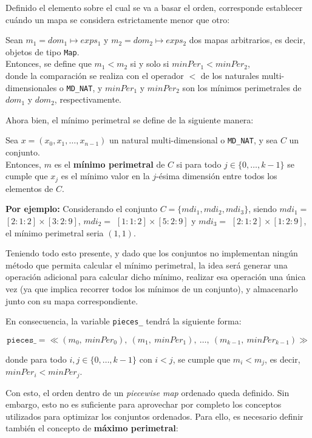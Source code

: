 Definido el elemento sobre el cual se va a basar el orden, corresponde establecer cuándo un mapa se considera estrictamente menor que otro:

\begin{center}
Sean $m_1 = dom_1 \longmapsto exps_1$ y $m_2 = dom_2 \longmapsto exps_2$ dos mapas arbitrarios, es decir, objetos de tipo \texttt{Map}. \\
Entonces, se define que $m_1 < m_2$ si y solo si $minPer_1 < minPer_2$, \\
donde la comparación se realiza con el operador $<$ de los naturales multi-dimensionales o \texttt{MD\_NAT}, y $minPer_1$ y $minPer_2$ son los mínimos perimetrales de $dom_1$ y $dom_2$, respectivamente.
\end{center}

Ahora bien, el mínimo perimetral se define de la siguiente manera:

\begin{center}
Sea $x = (x_0, x_1, \dots, x_{n-1})$ un natural multi-dimensional o \texttt{MD\_NAT}, y sea $C$ un conjunto. \\
Entonces, $m$ es el \textbf{mínimo perimetral} de $C$ si para todo $j \in \{0, \dots, k-1\}$ se cumple que $x_j$ es el mínimo valor en la $j$-ésima dimensión entre todos los elementos de $C$.

\textbf{Por ejemplo:} Considerando el conjunto $C = \{mdi_1,mdi_2,mdi_3\}$, siendo $mdi_1 =$ $[2:1:2]\times[3:2:9]$, $mdi_2 =$ $[1:1:2]\times[5:2:9]$ y $mdi_3 =$ $[2:1:2]\times[1:2:9]$, el mínimo perimetral seria $(1,1)$. 
\end{center}

Teniendo todo esto presente, y dado que los conjuntos no implementan ningún método que permita calcular el mínimo perimetral, la idea será generar una operación adicional para calcular dicho mínimo, realizar esa operación una única vez (ya que implica recorrer todos los mínimos de un conjunto), y almacenarlo junto con su mapa correspondiente. 

En consecuencia, la variable \texttt{pieces\_} tendrá la siguiente forma:

\[
\texttt{pieces\_} = \ll (m_0,\ minPer_0),\ (m_1,\ minPer_1),\ \dots,\ (m_{k-1},\ minPer_{k-1}) \gg
\]

donde para todo $i, j \in \{0,\dots,k-1\}$ con $i < j$, se cumple que $m_i < m_j$, es decir, $minPer_i < minPer_j$.

Con esto, el orden dentro de un \textit{piecewise map} ordenado queda definido. Sin embargo, esto no es suficiente para aprovechar por completo los conceptos utilizados para optimizar los conjuntos ordenados. Para ello, es necesario definir también el concepto de \textbf{máximo perimetral}:

